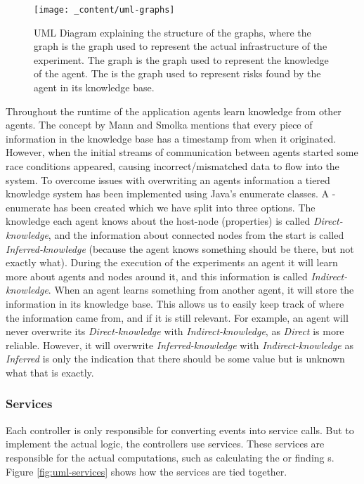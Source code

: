 \begin{figure}[H]
    \hspace*{-1cm}     
    \centering
    \texttt{[image: \_content/uml-graphs]}
    \caption{UML Diagram explaining the structure of the graphs, where the  graph is the graph used to represent the actual infrastructure of the experiment. The  graph is the graph used to represent the knowledge of the agent. The  is the graph used to represent risks found by the agent in its knowledge base.}
    \label{fig:uml-graphs}
\end{figure}

Throughout the runtime of the application agents learn knowledge from other agents. The concept by Mann and Smolka\cite{mann2023ADRIAN} mentions that every piece of information in the knowledge base has a timestamp from when it originated. However, when the initial streams of communication between agents started some race conditions appeared, causing incorrect/mismatched data to flow into the system. To overcome issues with overwriting an agents information a tiered knowledge system has been implemented using Java's enumerate classes. A -enumerate has been created which we have split into three options. The knowledge each agent knows about the host-node (properties) is called \emph{Direct-knowledge}, and the information about connected nodes from the start is called \emph{Inferred-knowledge} (because the agent knows something should be there, but not exactly what). During the execution of the experiments an agent it will learn more about agents and nodes around it, and this information is called \emph{Indirect-knowledge}. When an agent learns something from another agent, it will store the information in its knowledge base. This allows us to easily keep track of where the information came from, and if it is still relevant. For example, an agent will never overwrite its \emph{Direct-knowledge} with \emph{Indirect-knowledge}, as \emph{Direct} is more reliable. However, it will overwrite \emph{Inferred-knowledge} with \emph{Indirect-knowledge} as \emph{Inferred} is only the indication that there should be some value but is unknown what that is exactly.

\subsubsection{Services}
\label{sssec:services}
Each controller is only responsible for converting events into service calls. But to implement the actual logic, the controllers use services. These services are responsible for the actual computations, such as calculating the  or finding s. Figure \ref{fig:uml-services} shows how the services are tied together.

